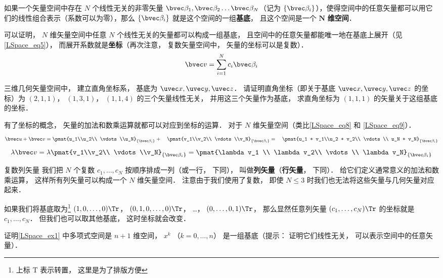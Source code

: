 如果一个矢量空间中存在 $N$ 个线性无关的非零矢量 $\bvec \beta_1, \bvec \beta_2 \dots \bvec \beta_N$（记为 $\{\bvec \beta_i\}$），使得空间中的任意矢量都可以用它们的线性组合表示（系数可以为零），那么 $\{\bvec \beta_i\}$ 就是这个空间的一组\textbf{基底}， 且这个空间是一个 $\boldsymbol{N}$ \textbf{维空间}．

可以证明， $N$ 维矢量空间中任意 $N$ 个线性无关的矢量都可以构成一组基底， 且空间中的任意矢量都能唯一地在基底上展开（见\autoref{LSpace_eq5}）， 而展开系数就是\textbf{坐标}（再次注意， 复数矢量空间中， 矢量的坐标可以是复数）．
\begin{equation}
\bvec v = \sum_{i=1}^N c_i \bvec \beta_i
\end{equation}

\begin{exercise}{}
三维几何矢量空间中， 建立直角坐标系， 基底为 $\uvec x, \uvec y, \uvec z$． 请证明直角坐标（即关于基底 $\uvec x, \uvec y, \uvec z$ 的坐标）为 $(2, 1, 1)$， $(1, 3, 1)$， $(1, 1, 4)$ 的三个矢量线性无关， 并用这三个矢量作为基底， 求直角坐标为 $(1, 1, 1)$ 的矢量关于这组基底的坐标．
\end{exercise}

有了坐标的概念， 矢量的加法和数乘运算就都可以对应到坐标的运算． 对于 $N$ 维矢量空间（类比\autoref{LSpace_eq8} 和 \autoref{LSpace_eq9}）．
\begin{equation}
\bvec u + \bvec v = \pmat{u_1\\u_2\\ \vdots\\u_N}_{\{\bvec\beta_i\}} + \quad \pmat{v_1\\v_2\\ \vdots \\v_N}_{\{\bvec\beta_i\}} = \quad \pmat{u_1 + v_1\\u_2 + v_2\\ \vdots \\ u_N + v_N}_{\{\bvec\beta_i\}}
\end{equation}
\begin{equation}
\lambda \bvec v = \lambda\pmat{v_1\\v_2\\ \vdots \\v_N}_{\{\bvec\beta_i\}} = \pmat{\lambda v_1 \\ \lambda v_2\\ \vdots \\ \lambda v_N}_{\{\bvec\beta_i\}}
\end{equation}

\begin{exercise}{复数列矢量}
我们把 $N$ 个复数 $c_1, \dots, c_N$ 按顺序排成一列（或一行， 下同）， 叫做\textbf{列矢量}（\textbf{行矢量}， 下同）． 给它们定义通常意义的加法和数乘运算， 这样所有列矢量可以构成一个 $N$ 维矢量空间． 注意由于我们使用了复数， 即使 $N \leqslant 3$ 时我们也无法将这些矢量与几何矢量对应起来．

如果我们将基底取为\footnote{上标 $\mathrm T$ 表示转置， 这里是为了排版方便} $(1, 0, \dots, 0)\Tr$， $(0, 1, 0, \dots, 0)\Tr$， …， $(0, \dots, 0, 1)\Tr$， 那么显然任意列矢量 $(c_1, \dots, c_N)\Tr$ 的坐标就是 $c_1, \dots, c_N$． 但我们也可以取其他基底， 这时坐标就会改变．
\end{exercise}

\begin{exercise}{}
证明\autoref{LSpace_ex1} 中多项式空间是 $n+1$ 维空间， $x^k$ （$k = 0, \dots, n$） 是一组基底（提示： 证明它们线性无关， 可以表示空间中的任意矢量）．
\end{exercise}
